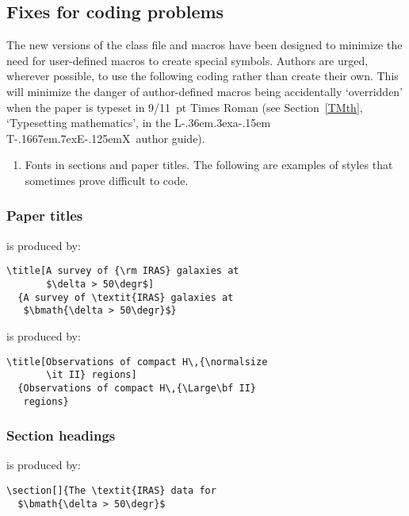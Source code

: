 \documentclass[useAMS,usenatbib]{mn2e}
\def\LaTeX{L\kern-.36em\raise.3ex\hbox{a}\kern-.15em
    T\kern-.1667em\lower.7ex\hbox{E}\kern-.125emX}
\begin{document}
\label{here}

\subsection{Fixes for coding problems}

The new versions of the class file and macros have been designed
to minimize the need for user-defined macros to  create  special
symbols. Authors are urged, wherever possible, to use the
following coding rather than create their own. This will minimize
the danger of author-defined macros being accidentally
`overridden' when the paper is typeset in 9/11~pt Times Roman (see
Section~\ref{TMth}, `Typesetting  mathematics', in the \LaTeX\
author guide).
%
\begin{enumerate}
\item Fonts in sections and paper titles. The following are  examples
of styles that sometimes prove difficult to code.
\end{enumerate}


\subsubsection*{P\lowercase{aper titles}}

%
is produced by:
%
\begin{verbatim}
\title[A survey of {\rm IRAS} galaxies at
       $\delta > 50\degr$]
  {A survey of \textit{IRAS} galaxies at
   $\bmath{\delta > 50\degr}$}
\end{verbatim}
\bigskip

%
is produced by:
%
\begin{verbatim}
\title[Observations of compact H\,{\normalsize
       \it II} regions]
  {Observations of compact H\,{\Large\bf II}
   regions}
\end{verbatim}


\subsubsection*{S\lowercase{ection headings}}

%
is produced by:
%
\begin{verbatim}
\section[]{The \textit{IRAS} data for
  $\bmath{\delta > 50\degr}$
\end{verbatim}
\bigskip
\end{document}
